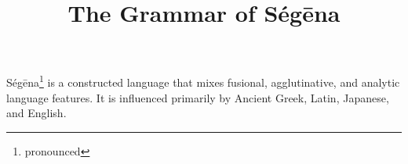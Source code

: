 \documentclass{report}
\begin{document}
\title{The Grammar of Ségēna}
\maketitle

Ségēna\footnote{pronounced \textipa{[se(;)"ge:na]}} is a constructed language
that mixes fusional, agglutinative, and analytic language features. It is
influenced primarily by Ancient Greek, Latin, Japanese, and English.

\tableofcontents



\end{document}
